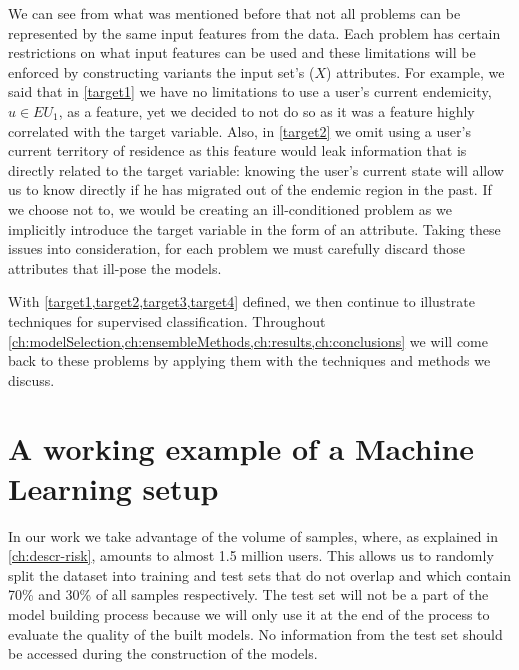 



We can see from what was mentioned before that not all problems can be represented by the same input features from the data.
Each problem has certain restrictions on what input features can be used and these limitations will be enforced by constructing variants the input set's ($X$) attributes.
For example, we said that in \cref{target1} we have no limitations to use a user's current endemicity, $u \in EU_{1}$, as a feature, yet we decided to not do so as it was a feature highly correlated with the target variable.
Also, in \cref{target2} we omit using a user's current territory of residence as this feature would leak information that is directly related to the target variable: knowing the user's current state will allow us to know directly if he has migrated out of the endemic region in the past.
If we choose not to, we would be creating an ill-conditioned problem as we implicitly introduce the target variable in the form of an attribute.
Taking these issues into consideration, for each problem we must carefully discard those attributes that ill-pose the models.


With \cref{target1,target2,target3,target4} defined, we then continue to illustrate techniques for supervised classification.
Throughout \cref{ch:modelSelection,ch:ensembleMethods,ch:results,ch:conclusions} we will come back to these problems by applying them with the techniques and methods we discuss.


\section{A working example of a Machine Learning setup}\label{section-example}

In our work we take advantage of the volume of samples, where, as explained in \cref{ch:descr-risk}, amounts to almost 1.5 million users.
This allows us to randomly split the dataset into training and test sets that do not overlap and which contain 70\% and 30\% of all samples respectively.
The test set will not be a part of the model building process because we will only use it at the end of the process to evaluate the quality of the built models.
No information from the test set should be accessed during the construction of the models.

